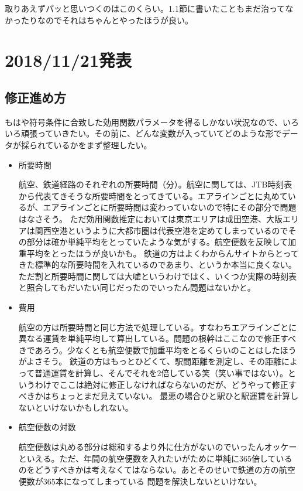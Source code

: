 \documentclass{jsarticle}
\begin{document}
取りあえずパッと思いつくのはこのくらい。1.1節に書いたこともまだ治ってなかったりなのでそれはちゃんとやったほうが良い。


\section{2018/11/21発表}
\subsection{修正進め方}

もはや符号条件に合致した効用関数パラメータを得るしかない状況なので、いろいろ頑張っていきたい。その前に、どんな変数が入っていてどのような形でデータが採られているかをまず整理したい。

\begin{itemize}
\item 所要時間

航空、鉄道経路のそれぞれの所要時間（分）。航空に関しては、JTB時刻表から代表てきそうな所要時間をとってきている。エアラインごとに丸めているが、エアラインごとに所要時間は変わっていないので特にその部分で問題はなさそう。
ただ効用関数推定においては東京エリアは成田空港、大阪エリアは関西空港というように大都市圏は代表空港を定めてしまっているのでその部分は確か単純平均をとっていたような気がする。航空便数を反映して加重平均をとったほうが良いかも。
鉄道の方はよくわからんサイトからとってきた標準的な所要時間を入れているのであまり、というか本当に良くない。ただ割と所要時間に関しては大嘘というわけではく、いくつか実際の時刻表と照合してもだいたい同じだったのでいったん問題はないかと。

\item 費用

航空の方は所要時間と同じ方法で処理している。すなわちエアラインごとに異なる運賃を単純平均して算出している。問題の根幹はここなので修正すべきであろう。少なくとも航空便数で加重平均をとるくらいのことはしたほうがよさそう。
鉄道の方はもっとひどくて、駅間距離を測定し、その距離によって普通運賃を計算し、そんでそれを2倍している笑（笑い事ではない）。というわけでここは絶対に修正しなければならないのだが、どうやって修正すべきかはちょっとまだ見えていない。
最悪の場合ひと駅ひと駅運賃を計算しないといけないかもしれない。

\item 航空便数の対数

航空便数は丸める部分は総和するより外に仕方がないのでいったんオッケーといえる。ただ、年間の航空便数を入れたいがために単純に365倍しているのをどうすべきかは考えなくてはならない。あとそのせいで鉄道の方の航空便数が365本になってしまっている
問題を解決しないといけない。


\end{itemize}
\end{document}

